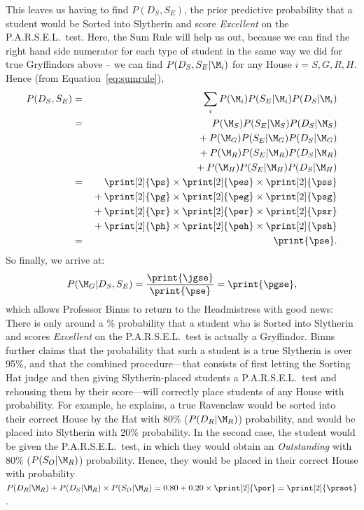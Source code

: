 This leaves us having to find $P(D_S,S_E)$, the prior predictive probability that a student would be Sorted into Slytherin and score \emph{Excellent} on the P.A.R.S.E.L.\ test. Here, the Sum Rule will help us out, because we can find the right hand side numerator for each type of student in the same way we did for true Gryffindors above -- we can find $P(D_S,S_E|\M_i)$ for any House $i = S, G, R, H$. Hence (from Equation~\ref{eq:sumrule}), 
\begin{eqnarray*}
P(D_S,S_E)  &=& \sum_i P(\M_i)P(S_E|\M_i)P(D_S|\M_i) \\
 &=&    P(\M_S)P(S_E|\M_S)P(D_S|\M_S) \\
 && {}+ P(\M_G)P(S_E|\M_G)P(D_S|\M_G)\\
 && {}+ P(\M_R)P(S_E|\M_R)P(D_S|\M_R) \\ 
 && {}+ P(\M_H)P(S_E|\M_H)P(D_S|\M_H)\\
&=&    \print[2]{\ps} \times \print[2]{\pes} \times \print[2]{\pss} \\
&& {}+ \print[2]{\pg} \times \print[2]{\peg} \times \print[2]{\psg} \\
&& {}+ \print[2]{\pr} \times \print[2]{\per} \times \print[2]{\psr} \\
&& {}+ \print[2]{\ph} \times \print[2]{\peh} \times \print[2]{\psh} \\
 &=& \print{\pse}.
\end{eqnarray*}
So finally, we arrive at:
$$P(\M_G|D_S,S_E) = \frac{\print{\jgse}}{\print{\pse}} = \print{\pgse},$$
which allows Professor Binns to return to the Headmistress with good news: There is only around a \print[0]{\pgsepct}\% probability that a student who is Sorted into Slytherin and scores \emph{Excellent} on the P.A.R.S.E.L.\ test is actually a Gryffindor. Binns further claims that the probability that such a student is a true Slytherin is over 95\%, and that the combined procedure{---that consists of first letting the Sorting Hat judge and then giving Slytherin-placed students a P.A.R.S.E.L.\ test and rehousing them by their score---}will correctly place students of any House with   probability.
%
%
%
%
%
{For example, he explains, a true Ravenclaw would be sorted into their correct House by the Hat with 80\% ($P(D_R|\M_R)$) probability, and would be placed into Slytherin with 20\% probability. In the second case, the student would be given the P.A.R.S.E.L.\ test, in which they would obtain an \emph{Outstanding} with 80\% ($P(S_O|\M_R)$) probability. Hence, they would be placed in their correct House with probability $P(D_R|\M_R) + P(D_S|\M_R) \times P(S_O|\M_R) = 0.80 + 0.20 \times \print[2]{\por} = \print[2]{\prsot}$.}

